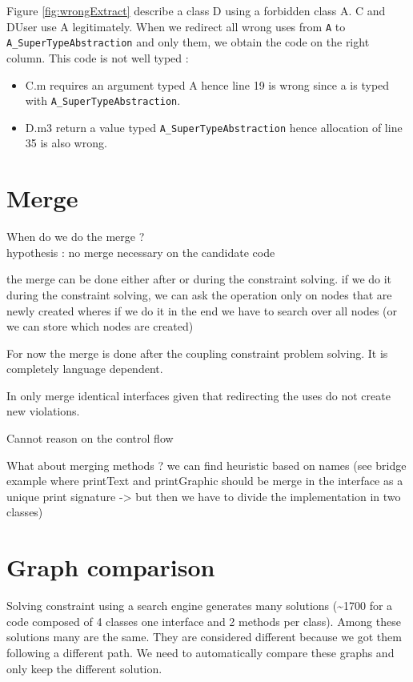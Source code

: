 \documentclass[]{article}
\begin{document}
Figure \ref{fig:wrongExtract} describe a class D using a forbidden class A. C and DUser use A legitimately. When we redirect all wrong uses from \texttt{A} to \texttt{A\_SuperTypeAbstraction} and only them, we obtain the code on the right column.
This code is not well typed : 

\begin{itemize}
\item C.m requires an argument typed A hence line 19 is wrong since a is typed with \texttt{A\_SuperTypeAbstraction}.
\item D.m3 return a value typed \texttt{A\_SuperTypeAbstraction} hence allocation of line 35 is also wrong. 
\end{itemize}


\section{Merge}

When do we do the merge ?\\
hypothesis : no merge necessary on the candidate code

the merge can be done either after or during the constraint solving.
if we do it during the constraint solving, we can ask the operation only on nodes that are newly created wheres if we do it in the end we have to search over all nodes (or we can store which nodes are created)


For now the merge is done after the coupling constraint problem solving. It is completely language dependent.

In only merge identical interfaces given that redirecting the uses do not create new violations.

Cannot reason on the control flow 

What about merging methods ?  we can find heuristic based on names (see bridge example where printText and printGraphic should be merge in the interface as a unique print signature -> but then we have to divide the implementation in two classes)


\section{Graph comparison}
Solving constraint using a search engine generates many solutions (\textasciitilde 1700 for a code composed of 4 classes one interface and 2 methods per class). Among these solutions many are the same. They are considered different because we got them following a different path.
We need to automatically compare these graphs and only keep the different solution.
\end{document}
